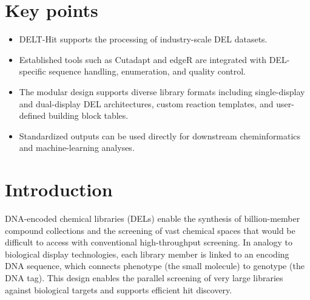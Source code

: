 \documentclass[pdflatex,sn-nature]{sn-jnl}
\begin{document}

\maketitle

\section*{Key points}

\begin{itemize}
  \item DELT-Hit supports the processing of industry-scale DEL datasets.
  \item Established tools such as Cutadapt and edgeR are integrated with DEL-specific sequence handling, enumeration, and quality control.
  \item The modular design supports diverse library formats including single-display and dual-display DEL architectures, custom reaction templates, and user-defined building block tables.
  \item Standardized outputs can be used directly for downstream cheminformatics and machine-learning analyses.
\end{itemize}

\section{Introduction}
DNA-encoded chemical libraries (DELs) enable the synthesis of billion-member compound collections and the screening of vast chemical spaces that would be difficult to access with conventional high-throughput screening\cite{brenner_encodedcombinatorialchemistry_1992,franzini_dnaencodedchemicallibraries_2014,favalli_dnaencodedchemicallibraries_2018,neri_dnaencodedchemicallibraries_2018,fitzgerald_dnaencodedchemistrydrug_2021,keller_impactdnaencodedchemical_2022,satz_dnaencodedchemicallibraries_2022,peterson_smallmoleculediscoverydnaencoded_2023,wichert_challengesprospectsdnaencoded_2024}. In analogy to biological display technologies, each library member is linked to an encoding DNA sequence, which connects phenotype (the small molecule) to genotype (the DNA tag). This design enables the parallel screening of very large libraries against biological targets and supports efficient hit discovery\cite{neri_dnaencodedchemicallibraries_2018,huang_strategiesdevelopingdnaencoded_2022}.
\end{document}
